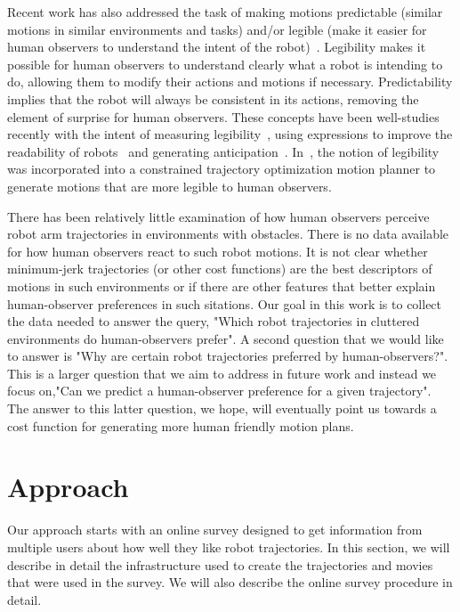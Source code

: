 \documentclass[letterpaper, 10 pt, conference]{ieeeconf}  %
\begin{document}
Recent work has also addressed the task of making motions predictable (similar motions in similar environments and tasks) and/or legible (make it easier for human observers to understand the intent of the robot)~\cite{Beetz:2010}. Legibility makes it possible for human observers to understand clearly what a robot is intending to do, allowing them to modify their actions and motions if necessary. Predictability implies that the robot will always be consistent in its actions, removing the element of surprise for human observers. These concepts have been well-studies recently with the intent of measuring legibility~\cite{Lichtenthaler:2011}, using expressions to improve the readability of robots~\cite{Takayama:2011} and generating anticipation~\cite{Gielniak:2011}. In~\cite{Dragan:2013}, the notion of legibility was incorporated into a constrained trajectory optimization motion planner to generate motions that are more legible to human observers. 

There has been relatively little examination of how human observers perceive robot arm trajectories in environments with obstacles. There is no data available for how human observers react to such robot motions. It is not clear whether minimum-jerk trajectories (or other cost functions) are the best descriptors of motions in such environments or if there are other features that better explain human-observer preferences in such sitations. Our goal in this work is to collect the data needed to answer the query, "Which robot trajectories in cluttered environments do human-observers prefer". A second question that we would like to answer is "Why are certain robot trajectories preferred by human-observers?". This is a larger question that we aim to address in future work and instead we focus on,"Can we predict a human-observer preference for a given trajectory". The answer to this latter question, we hope, will eventually point us towards a cost function for generating more human friendly motion plans. 

\section{Approach}
\label{sec:survey}
Our approach starts with an online survey designed to get information from multiple users about how well they like robot trajectories. In this section, we will describe in detail the infrastructure used to create the trajectories and movies that were used in the survey. We will also describe the online survey procedure in detail. 
\end{document}
